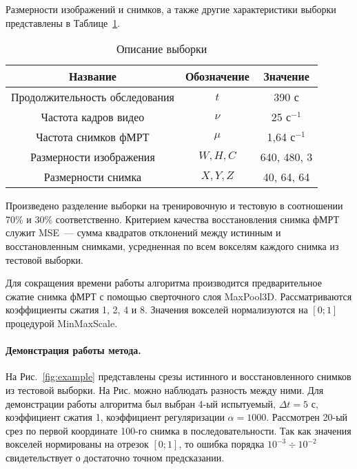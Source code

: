 \documentclass[a4paper, 12pt]{extarticle}
\begin{document}
Размерности изображений и снимков, а также другие характеристики выборки представлены в
Таблице~\ref{table:sample}.

\begin{table}[h!]
	\centering
	\caption{Описание выборки}
	\begin{tabular}{|c|c|c|}
		\hline
		Название                       & Обозначение & Значение             \\
		\hline \hline
		Продолжительность обследования & $t$         & 390 с                \\ \hline
		Частота кадров видео           & $\nu$       & 25 $\text{с}^{-1}$   \\ \hline
		Частота снимков фМРТ           & $\mu$       & 1,64 $\text{с}^{-1}$ \\ \hline
		Размерности изображения        & $W, H, C$   & 640, 480, 3          \\ \hline
		Размерности снимка             & $X, Y, Z$   & 40, 64, 64           \\ \hline
	\end{tabular}
	\label{table:sample}
\end{table}

Произведено разделение выборки на тренировочную и тестовую в соотношении 70\% и 30\% соответственно.
Критерием качества восстановления снимка фМРТ служит MSE~--- сумма квадратов отклонений
между истинным и восстановленным снимками, усредненная по всем вокселям каждого снимка
из тестовой выборки.

Для сокращения времени работы алгоритма производится предварительное сжатие снимка фМРТ
с помощью сверточного слоя MaxPool3D. Рассматриваются коэффициенты сжатия 1, 2, 4 и 8.
Значения вокселей нормализуются на $[0; 1]$ процедурой MinMaxScale.

\paragraph*{Демонстрация работы метода.}

На Рис.~\ref*{fig:example} представлены срезы истинного и восстановленного снимков из
тестовой выборки. На Рис. можно наблюдать разность между ними.
Для демонстрации работы алгоритма был выбран 4-ый испытуемый, $\Delta t = 5 \text{ с}$, коэффициент сжатия 1, коэффициент регуляризации
$\alpha = 1000$. Рассмотрен 20-ый срез по первой координате 100-го снимка в последовательности.
Так как значения вокселей нормированы на отрезок $[0; 1]$, то ошибка порядка $10^{-3} \div 10^{-2}$
свидетельствует о достаточно точном предсказании.
\end{document}
